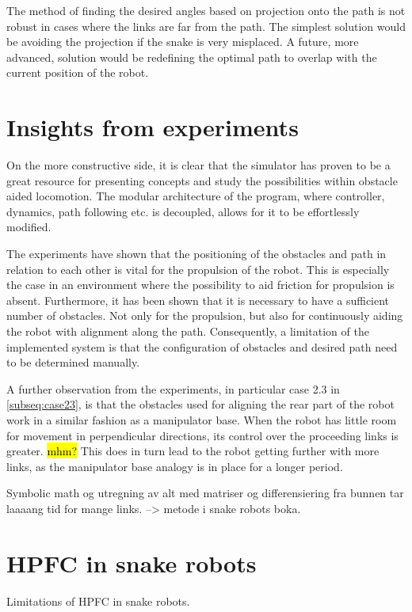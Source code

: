 The method of finding the desired angles based on projection onto the path is not robust in cases where the links are far from the path. The simplest solution would be avoiding the projection if the snake is very misplaced. A future, more advanced, solution would be redefining the optimal path to overlap with the current position of the robot.

\section{Insights from experiments}

On the more constructive side, it is clear that the simulator has proven to be a great resource for presenting concepts and study the possibilities within obstacle aided locomotion. The modular architecture of the program, where controller, dynamics, path following etc. is decoupled, allows for it to be effortlessly modified.

The experiments have shown that the positioning of the obstacles and path in relation to each other is vital for the propulsion of the robot. This is especially the case in an environment where the possibility to aid friction for propulsion is absent. Furthermore, it has been shown that it is necessary to have a sufficient number of obstacles. Not only for the propulsion, but also for continuously aiding the robot with alignment along the path. Consequently, a limitation of the implemented system is that the configuration of obstacles and desired path need to be determined manually.

A further observation from the experiments, in particular case 2.3 in \ref{subseq:case23}, is that the obstacles used for aligning the rear part of the robot work in a similar fashion as a manipulator base. When the robot has little room for movement in perpendicular directions, its control over the proceeding links is greater. \hl{mhm?} This does in turn lead to the robot getting further with more links, as the manipulator base analogy is in place for a longer period.

Symbolic math og utregning av alt med matriser og differensiering fra bunnen tar laaaang tid for mange links. --> metode i snake robots boka.

\section{HPFC in snake robots}

Limitations of HPFC in snake robots.



